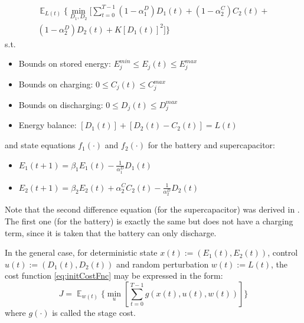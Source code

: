 \documentclass[conference]{IEEEtran}
\DeclareMathOperator{\E}{\mathbb{E}}
\begin{document}
\begin{multline} \label{eq:initCostFnc}
    \mathop{\E}_{L(t)} \Biggl\{\min_{D_{1},D_{2}}[\sum_{t=0}^{T-1}
	(1-\alpha_{1}^{D})D_{1}(t)+
	(1-\alpha_{2}^{C})C_{2}(t)+\\
	(1-\alpha_{2}^{D})D_{2}(t)+
	K\left[D_{1}(t)\right]^{2}
	]\Biggr\}\end{multline}
s.t.
\begin{itemize}
    \item Bounds on stored energy: 
	\begin{math}E_{j}^{min}\leq E_{j}(t)\leq E_{j}^{max}\end{math}
	\item Bounds on charging:
	\begin{math}0\leq C_{j}(t)\leq C_{j}^{max}\end{math}
	\item Bounds on discharging:
	\begin{math}0\leq D_{j}(t)\leq D_{j}^{max}\end{math}
	\item Energy balance:
	\begin{math}\left[D_{1}(t)\right] + \left[D_{2}(t) - C_{2}(t)\right] = L(t)\end{math}
\end{itemize}
and state equations $f_{1}(\cdot)$ and $f_{2}(\cdot)$ for the battery and supercapacitor:
\begin{itemize}
    \item \begin{math}E_{1}(t+1)=\beta_{1}E_{1}(t)-\frac{1}{\alpha_{1}^{D}}D_{1}(t)\end{math}
    \item \begin{math}E_{2}(t+1)=\beta_{2}E_{2}(t)+\alpha_{2}^{C}C_{2}(t)-\frac{1}{\alpha_{2}^{D}}D_{2}(t)\end{math}\newline
\end{itemize} Note that the second difference equation (for the supercapacitor) was derived in \cite{su2013modeling}. The first one (for the battery) is exactly the same but does not have a charging term, since it is taken that the battery can only discharge.

In the general case, for deterministic state $x(t):=(E_{1}(t),E_{2}(t))$, control $u(t):=(D_{1}(t),D_{2}(t))$ and random perturbation $w(t):=L(t)$, the cost function \eqref{eq:initCostFnc} may be expressed in the form:
\begin{equation}J=\mathop{\E}_{w(t)} \Biggl\{\min_{u}\left[\sum_{t=0}^{T-1}g(x(t),u(t),w(t))\right]\Biggr\}\end{equation}
where $g(\cdot)$ is called the stage cost.
\end{document}
